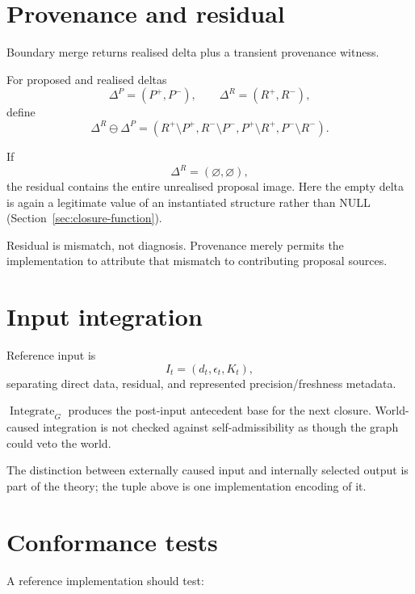 \documentclass[11pt,a4paper]{article}
\theoremstyle{remark}
\begin{document}
\section{Provenance and residual}\label{sec:residual}

Boundary merge returns realised delta plus a transient provenance witness.

For proposed and realised deltas
\[
\Delta^P=(P^+,P^-),
\qquad
\Delta^R=(R^+,R^-),
\]
define
\[
\boxed{
\Delta^R\ominus\Delta^P
=
\left(
R^+\setminus P^+,
R^-\setminus P^-,
P^+\setminus R^+,
P^-\setminus R^-
\right).
}
\]

If
\[
\Delta^R=(\varnothing,\varnothing),
\]
the residual contains the entire unrealised proposal image. Here the empty delta is again a legitimate value of an instantiated structure rather than NULL (Section~\ref{sec:closure-function}).

Residual is mismatch, not diagnosis. Provenance merely permits the implementation to attribute that mismatch to contributing proposal sources.

\section{Input integration}\label{sec:input}

Reference input is
\[
I_t=(d_t,\epsilon_t,K_t),
\]
separating direct data, residual, and represented precision/freshness metadata.

$\operatorname{Integrate}_G$ produces the post-input antecedent base for the next closure. World-caused integration is not checked against self-admissibility as though the graph could veto the world.

The distinction between externally caused input and internally selected output is part of the theory; the tuple above is one implementation encoding of it.

\section{Conformance tests}\label{sec:tests}

A reference implementation should test:
\end{document}
